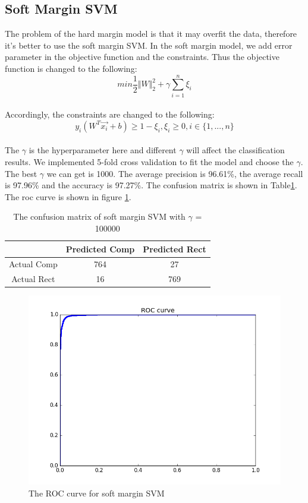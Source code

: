 \documentclass{article}
\begin{document}
\subsection{Soft Margin SVM}
The problem of the hard margin model is that it may overfit the data, therefore it's better to use the soft margin SVM. In the soft margin model, we add error parameter in the objective function and the constraints. Thus the objective function is changed to the following:
\begin{equation*}
min \frac{1}{2}\Vert W \Vert _2 ^2 + \gamma\sum_{i=1}^{n}\xi _i
\end{equation*}
\\
Accordingly, the constraints are changed to the following:
\begin{equation*}
y_i(W^T\overrightarrow{x_i}+b)\geq 1-\xi _i,  \xi _i \geq0,  i\in\lbrace 1, ..., n \rbrace
\end{equation*}
\\
The $\gamma$ is the hyperparameter here and different $\gamma$ will affect the classification results. We implemented 5-fold cross validation to fit the model and choose the $\gamma$.  The best $\gamma$ we can get is 1000. The average precision is 96.61\%, the average recall is 97.96\% and the accuracy is 97.27\%. The confusion matrix is shown in Table\ref{tb:confu_soft}. The roc curve is shown in figure \ref{fig:roc_soft}.
\begin{table}
\begin{center}
\caption{The confusion matrix of soft margin SVM with $\gamma$ = 100000}
\label{tb:confu_soft}
\begin{tabular}{|c|c|c|}
\hline
& Predicted Comp& Predicted Rect\\
\hline
Actual Comp&764&27\\
\hline
Actual Rect&16&769\\
\hline 	
\end{tabular}
\end{center}
\end{table}

\begin{figure}[htbp]
\centering
\includegraphics[width=.6\textwidth]{roc_soft.png}
\caption{The ROC curve for soft margin SVM}
\label{fig:roc_soft}
\end{figure}
\end{document}
